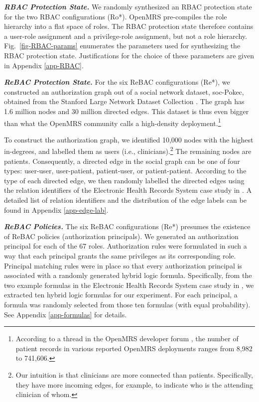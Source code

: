 \documentclass{acm_proc_article-sp}
\begin{document}
\textit{\textbf{RBAC Protection State.}}  We randomly synthesized an
RBAC protection state for the two RBAC 
configurations (\textsf{Ro}*). OpenMRS pre-compiles the role hierarchy into a flat
space of roles.  The RBAC protection state therefore contains a
user-role assignment and a privilege-role assignment, but not a role
hierarchy.  Fig.~\ref{fig-RBAC-params} enumerates the parameters used
for synthesizing the RBAC protection state.  Justifications for the
choice of these parameters are given in Appendix \ref{app-RBAC}.

\textit{\textbf{ReBAC Protection State.}}  For the six ReBAC
configurations (\textsf{Re}*), we constructed an authorization graph
out of a social network dataset, \textsf{soc-Pokec}, obtained from the
Stanford Large Network Dataset Collection \cite{SNAP}.  The graph has
1.6 million nodes and 30 million directed edges.  This dataset is thus
even bigger than what the OpenMRS community calls a high-density
deployment.\footnote{According to a thread in the OpenMRS developer
  forum \cite{Deployment}, the number of patient records in various
  reported OpenMRS deployments ranges from 8,982 to 741,606.}

To construct the authorization graph, we identified 10,000 nodes with
the highest in-degrees, and labelled them as users (i.e.,
clinicians).\footnote{Our intuition is that clinicians are more
  connected than patients.  Specifically, they have more
  incoming edges, for example, to indicate who is the attending
  clinician of whom.}  The remaining nodes are patients.
Consequently, a directed edge in the social graph can be one of four
types: user-user, user-patient, patient-user, or patient-patient.
According to the type of each directed edge, we then randomly labelled
the directed edges using the relation identifiers of the Electronic
Health Records System case study in \cite[\S 5]{Fong:2011}.  A
detailed list of relation identifiers and the distribution of the edge
labels can be found in Appendix \ref{app-edge-lab}.

\textit{\textbf{ReBAC Policies.}}  The six ReBAC configurations
(\textsf{Re}*) presumes the existence of ReBAC policies (authorization
principals).  We generated an authorization principal for each of the
67 roles.  Authorization rules were formulated in such a way that each
principal grants the same privileges as its corresponding role.
Principal matching rules were in place so that every authorization
principal is associated with a randomly generated hybrid logic
formula.  Specifically, from the two example formulas in the
Electronic Health Records System case study in \cite[\S 5]{Fong:2011},
we extracted ten hybrid logic formulas for our experiment.  For each
principal, a formula was randomly selected from those ten formulas
(with equal probability).  See Appendix \ref{app-formulas} for
details.
\end{document}
